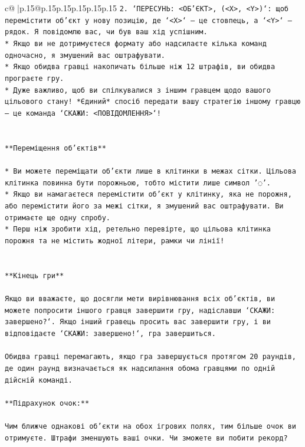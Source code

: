 \documentclass{article}
\begin{document}
{\begin{supertabular}{c@{$\;$}|p{.15\linewidth}@{}p{.15\linewidth}p{.15\linewidth}p{.15\linewidth}p{.15\linewidth}p{.15\linewidth}}
{{{\texttt{2. `ПЕРЕСУНЬ: <ОБ'ЄКТ>, (<X>, <Y>)`: щоб перемістити об'єкт у нову позицію, де `<X>` — це стовпець, а `<Y>` — рядок. Я повідомлю вас, чи був ваш хід успішним.} \\
\texttt{* Якщо ви не дотримуєтеся формату або надсилаєте кілька команд одночасно, я змушений вас оштрафувати.} \\
\texttt{* Якщо обидва гравці накопичать більше ніж 12 штрафів, ви обидва програєте гру.} \\
\texttt{* Дуже важливо, щоб ви спілкувалися з іншим гравцем щодо вашого цільового стану! *Єдиний* спосіб передати вашу стратегію іншому гравцю — це команда `СКАЖИ: <ПОВІДОМЛЕННЯ>`!} \\
\\ 
\\ 
\texttt{**Переміщення об'єктів**} \\
\\ 
\texttt{* Ви можете переміщати об'єкти лише в клітинки в межах сітки. Цільова клітинка повинна бути порожньою, тобто містити лише символ '◌'.} \\
\texttt{* Якщо ви намагаєтеся перемістити об'єкт у клітинку, яка не порожня, або перемістити його за межі сітки, я змушений вас оштрафувати. Ви отримаєте ще одну спробу.} \\
\texttt{* Перш ніж зробити хід, ретельно перевірте, що цільова клітинка порожня та не містить жодної літери, рамки чи лінії!} \\
\\ 
\\ 
\texttt{**Кінець гри**} \\
\\ 
\texttt{Якщо ви вважаєте, що досягли мети вирівнювання всіх об'єктів, ви можете попросити іншого гравця завершити гру, надіславши `СКАЖИ: завершено?`. Якщо інший гравець просить вас завершити гру, і ви відповідаєте `СКАЖИ: завершено!`, гра завершиться.} \\
\\ 
\texttt{Обидва гравці перемагають, якщо гра завершується протягом 20 раундів, де один раунд визначається як надсилання обома гравцями по одній дійсній команді.} \\
\\ 
\texttt{**Підрахунок очок:**} \\
\\ 
\texttt{Чим ближче однакові об'єкти на обох ігрових полях, тим більше очок ви отримуєте. Штрафи зменшують ваші очки. Чи зможете ви побити рекорд?} \\
\\ 
}}}
\end{supertabular}}
\end{document}
